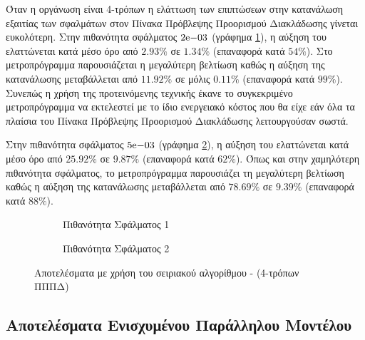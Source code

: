 Όταν η οργάνωση είναι 4-τρόπων η ελάττωση των επιπτώσεων στην κατανάλωση εξαιτίας των σφαλμάτων στον Πίνακα Πρόβλεψης Προορισμού Διακλάδωσης γίνεται ευκολότερη. Στην πιθανότητα σφάλματος $2\mathrm{e}{-03}$ (γράφημα \ref{fig:chap6_serial_4way_pail1_edp}), η αύξηση του \edp ελαττώνεται κατά μέσο όρο από $2.93\%$ σε $1.34\%$ (επαναφορά κατά $54\%$). Στο μετροπρόγραμμα  παρουσιάζεται η μεγαλύτερη βελτίωση καθώς η αύξηση της κατανάλωσης μεταβάλλεται από $11.92\%$ σε μόλις $0.11\%$ (επαναφορά κατά $99\%$). Συνεπώς η χρήση της προτεινόμενης τεχνικής έκανε το συγκεκριμένο μετροπρόγραμμα να εκτελεστεί με το ίδιο ενεργειακό κόστος που θα είχε εάν όλα τα πλαίσια του Πίνακα Πρόβλεψης Προορισμού Διακλάδωσης λειτουργούσαν σωστά.
\par
Στην πιθανότητα σφάλματος $5\mathrm{e}{-03}$ (γράφημα \ref{fig:chap6_serial_4way_pail2_edp}), η αύξηση του \edp ελαττώνεται κατά μέσο όρο από $25.92\%$ σε $9.87\%$ (επαναφορά κατά $62\%$). Όπως και στην χαμηλότερη πιθανότητα σφάλματος, το μετροπρόγραμμα  παρουσιάζει τη μεγαλύτερη βελτίωση καθώς η αύξηση της κατανάλωσης μεταβάλλεται από $78.69\%$ σε $9.39\%$ (επαναφορά κατά $88\%$).

\begin{figure}[!t]
    \centering
    \begin{subfigure}[t]{\textwidth}
        \centering
        \caption{Πιθανότητα Σφάλματος 1}
        \label{fig:chap6_serial_4way_pail1_edp}
    \end{subfigure}
    
    \begin{subfigure}[t]{\textwidth}
        \centering
        \caption{Πιθανότητα Σφάλματος 2}
        \label{fig:chap6_serial_4way_pail2_edp}
    \end{subfigure}
    \caption{Αποτελέσματα με χρήση του σειριακού αλγορίθμου - (4-τρόπων ΠΠΠΔ)}
    \label{fig:chap6_serial_4way_edp}
\end{figure}


\subsection{Αποτελέσματα Ενισχυμένου Παράλληλου Μοντέλου}
\label{chap6_mcpatParallelAlgResults}

